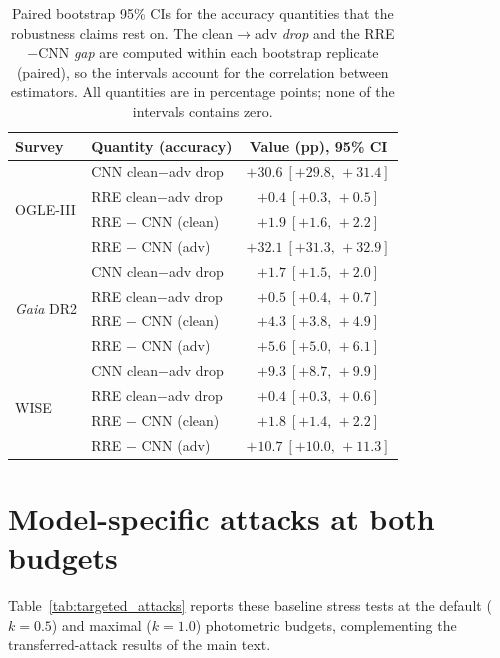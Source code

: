 \documentclass{aa}
\begin{document}
\begin{table}[htbp]\centering
\caption{Paired bootstrap 95\% CIs for the accuracy quantities that the robustness claims rest on. The clean$\to$adv \emph{drop} and the RRE$-$CNN \emph{gap} are computed within each bootstrap replicate (paired), so the intervals account for the correlation between estimators. All quantities are in percentage points; none of the intervals contains zero.}
\label{tab:bootstrap_diffs}
\setlength{\tabcolsep}{3pt}
\small
\begin{tabular}{llc}
\toprule
Survey & Quantity (accuracy) & Value (pp), 95\% CI\\
\midrule
\multirow{4}{*}{OGLE-III} & CNN clean$-$adv drop & $+30.6\ [+29.8,\,+31.4]$\\
 & RRE clean$-$adv drop & $+0.4\ [+0.3,\,+0.5]$\\
 & RRE $-$ CNN (clean) & $+1.9\ [+1.6,\,+2.2]$\\
 & RRE $-$ CNN (adv) & $+32.1\ [+31.3,\,+32.9]$\\
\midrule
\multirow{4}{*}{\textit{Gaia} DR2} & CNN clean$-$adv drop & $+1.7\ [+1.5,\,+2.0]$\\
 & RRE clean$-$adv drop & $+0.5\ [+0.4,\,+0.7]$\\
 & RRE $-$ CNN (clean) & $+4.3\ [+3.8,\,+4.9]$\\
 & RRE $-$ CNN (adv) & $+5.6\ [+5.0,\,+6.1]$\\
\midrule
\multirow{4}{*}{WISE} & CNN clean$-$adv drop & $+9.3\ [+8.7,\,+9.9]$\\
 & RRE clean$-$adv drop & $+0.4\ [+0.3,\,+0.6]$\\
 & RRE $-$ CNN (clean) & $+1.8\ [+1.4,\,+2.2]$\\
 & RRE $-$ CNN (adv) & $+10.7\ [+10.0,\,+11.3]$\\
\bottomrule
\end{tabular}
\end{table}



\section{Model-specific attacks at both budgets}
\label{app:sweeps}

Table~\ref{tab:targeted_attacks} reports these baseline stress tests at the default ($k=0.5$) and maximal ($k=1.0$) photometric budgets, complementing the transferred-attack results of the main text.
\end{document}
